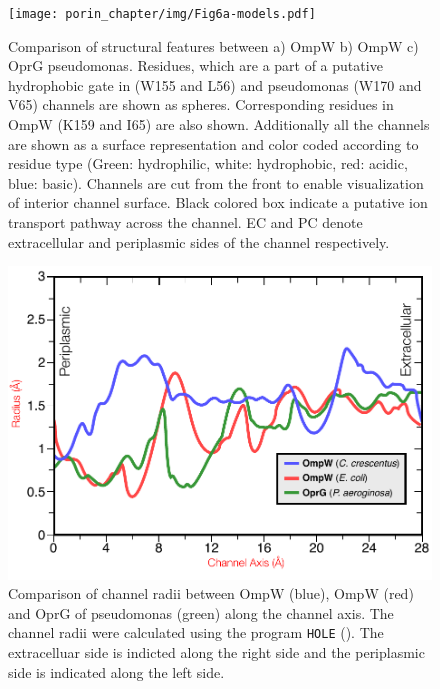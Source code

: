 \begin{figure}[htb]
  	\begin{center}
   		\texttt{[image: porin\_chapter/img/Fig6a-models.pdf]}
   	\end{center}
   	\caption[Structural properties of OmpW of \caulobacter]{
      Comparison of structural features between a) OmpW \caulobacter b) OmpW \ecoli c) OprG \ac{pseudomonas}. Residues, which are a part of a putative hydrophobic gate in \ecoli (W155 and L56) and \ac{pseudomonas} (W170 and V65) channels are shown as spheres. Corresponding residues in OmpW \caulobacter (K159 and I65) are also shown. Additionally all the channels are shown as a surface representation and color coded according to residue type (Green: hydrophilic, white: hydrophobic, red: acidic, blue: basic). Channels are cut from the front to enable visualization of interior channel surface. Black colored box indicate a putative ion transport pathway across the channel. EC and PC denote extracellular and periplasmic sides of the channel respectively.
   	}
   	\label{fig:porin-models}
\end{figure}   

\begin{figure}[htb]
  	\begin{center}
   		\includegraphics[]{porin_chapter/img/Fig6-poresizes.pdf}
   	\end{center}
   	\caption[Comparison of porin channel radii]{
Comparison of channel radii between \caulobacter OmpW (blue), \ecoli OmpW (red) and OprG of \ac{pseudomonas} (green) along the channel axis. The channel radii were calculated using the program \texttt{HOLE} (). The extracelluar side is indicted along the right side and the periplasmic side is indicated along the left side.
   	}
   	\label{fig:porin-poresizes}
\end{figure}   

